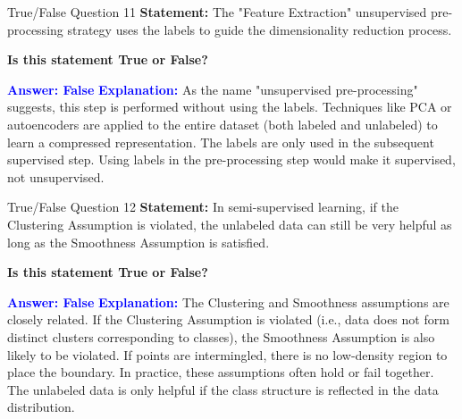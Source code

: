 \documentclass{beamer}
\begin{document}
	\begin{frame}{True/False Question 11}
		\textbf{Statement:} The "Feature Extraction" unsupervised pre-processing strategy uses the labels to guide the dimensionality reduction process.
		
		\vspace{0.3cm}
		\textbf{Is this statement True or False?}
		
		\vspace{0.2cm}
		\textcolor{blue}{\textbf{Answer: False}}
		\vspace{0.2cm}
		\textcolor{blue}{\textbf{Explanation:}} As the name "unsupervised pre-processing" suggests, this step is performed without using the labels. Techniques like PCA or autoencoders are applied to the entire dataset (both labeled and unlabeled) to learn a compressed representation. The labels are only used in the subsequent supervised step. Using labels in the pre-processing step would make it supervised, not unsupervised.
	\end{frame}
	
	\begin{frame}{True/False Question 12}
		\textbf{Statement:} In semi-supervised learning, if the Clustering Assumption is violated, the unlabeled data can still be very helpful as long as the Smoothness Assumption is satisfied.
		
		\vspace{0.3cm}
		\textbf{Is this statement True or False?}
		
		\vspace{0.2cm}
		\textcolor{blue}{\textbf{Answer: False}}
		\vspace{0.2cm}
		\textcolor{blue}{\textbf{Explanation:}} The Clustering and Smoothness assumptions are closely related. If the Clustering Assumption is violated (i.e., data does not form distinct clusters corresponding to classes), the Smoothness Assumption is also likely to be violated. If points are intermingled, there is no low-density region to place the boundary. In practice, these assumptions often hold or fail together. The unlabeled data is only helpful if the class structure is reflected in the data distribution.
	\end{frame}
	
\end{document}
